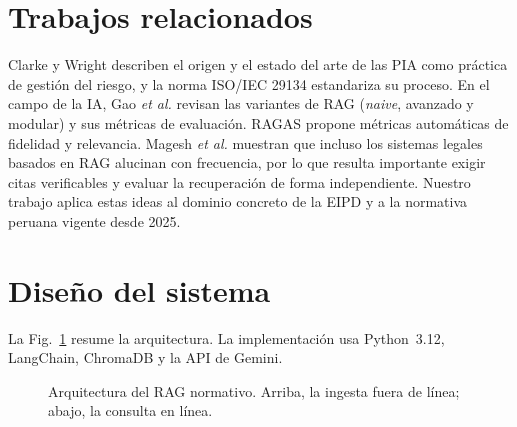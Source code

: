 \documentclass[conference]{IEEEtran}
\begin{document}
\section{Trabajos relacionados}
Clarke \cite{clarke2009pia} y Wright \cite{wright2012pia} describen el origen y el estado del arte de las PIA como práctica de gestión del riesgo, y la norma ISO/IEC 29134 \cite{iso29134} estandariza su proceso. En el campo de la IA, Gao \textit{et al.} \cite{gao2023survey} revisan las variantes de RAG (\emph{naive}, avanzado y modular) y sus métricas de evaluación. RAGAS \cite{es2023ragas} propone métricas automáticas de fidelidad y relevancia. Magesh \textit{et al.} \cite{magesh2024hallucination} muestran que incluso los sistemas legales basados en RAG alucinan con frecuencia, por lo que resulta importante exigir citas verificables y evaluar la recuperación de forma independiente. Nuestro trabajo aplica estas ideas al dominio concreto de la EIPD y a la normativa peruana vigente desde 2025.

\section{Diseño del sistema}

La Fig.~\ref{fig:arq} resume la arquitectura. La implementación usa Python~3.12, LangChain, ChromaDB y la API de Gemini.

\begin{figure}[t]
\centering
{}
\caption{Arquitectura del RAG normativo. Arriba, la ingesta fuera de línea; abajo, la consulta en línea.}
\label{fig:arq}
\end{figure}
\end{document}
